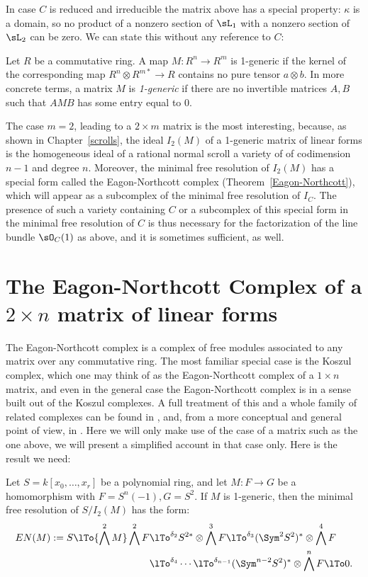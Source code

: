 In case $C$ is reduced and irreducible the matrix above has a special property: $\kappa $ is a domain, so no product of a nonzero
section of $\sL_1$ with a nonzero section of $\sL_2$ can be zero. We can state this without any reference to $C$:

\begin{definition}
Let $R$ be a commutative ring. A map $M:R^n\to R^m$ is 1-generic if the kernel of the corresponding
 map $R^{n}\otimes R^{m*} \to R$  contains no pure tensor $a\otimes b$. In more concrete terms, a matrix
$M$ is \emph{1-generic} if there are no invertible matrices $A,B$ such that  $AMB$ has some entry equal to 0.
\end{definition}

The case $m=2$, leading to a $2\times m$ matrix is the most interesting, because, as shown in Chapter~\ref{scrolls}, the ideal $I_2(M)$ of a 1-generic matrix of linear forms is the homogeneous ideal of a rational normal 
scroll a variety of of codimension $n-1$ and degree $n$. 
Moreover, the minimal free resolution of $I_2(M)$ has a special form called the 
Eagon-Northcott complex (Theorem~\ref{Eagon-Northcott}), which will appear as a subcomplex of the minimal free resolution of $I_C$. The presence of such a variety containing $C$ or
a subcomplex of this special form in the minimal free resolution of $C$ is thus necessary for the 
factorization of the line bundle $\sO_C(1)$ as above, and it is sometimes sufficient, as well.

\section{The Eagon-Northcott Complex of a $2\times n$ matrix of linear forms}

The Eagon-Northcott complex is a complex of free modules associated to any matrix over any commutative ring. The most familiar special case is the Koszul complex, which one may think of as the Eagon-Northcott complex of a $1\times n$ matrix, and  even in the general case the Eagon-Northcott complex is in a sense built out of the Koszul complexes. A full treatment of this and a whole family of related complexes can be found in 
\cite[Appendix A2]{Eisenbud1995}, and, from a more conceptual and general point of view, in \cite{Weyman-book}. Here we will only
make use of the case of a matrix such as the one above, we will present a simplified account in that case only. Here is the result we need:

\begin{theorem}\label{Eagon-Northcott}
 Let $S = k[x_0,\dots, x_r]$ be a polynomial ring,  and let $M: F\to G$ be a homomorphism with
 $F = S^n(-1), G= S^2$. If $M$ is 1-generic, then the minimal free resolution of $S/I_2(M)$ has the form:
\begin{align*}
EN(M) := 
S \lTo{\bigwedge^2 M} 
 \bigwedge^2 F&
 \lTo^{\delta_{2}}
 S^{2*}\otimes \bigwedge^3 F  \lTo^{\delta_{3}}
  (\Sym^2S^{2})^*\otimes\bigwedge^4F  \\
 &\lTo^{\delta_{4}}\cdots\lTo^{\delta_{n-1}} 
(\Sym^{n-2}S^{2})^*\otimes\bigwedge^nF 
 \lTo 0.
\end{align*}
\end{theorem}

